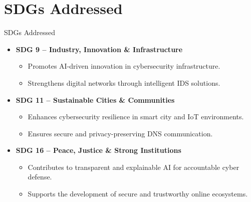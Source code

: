 \documentclass[aspectratio=169,xcolor=dvipsnames]{beamer}
\begin{document}
\section{SDGs Addressed}
\begin{frame}{SDGs Addressed}
\begin{itemize}

\item \textbf{SDG 9 – Industry, Innovation \& Infrastructure}
\begin{itemize}
    \item Promotes AI-driven innovation in cybersecurity infrastructure.
    \item Strengthens digital networks through intelligent IDS solutions.
\end{itemize}

\item \textbf{SDG 11 – Sustainable Cities \& Communities}
\begin{itemize}
    \item Enhances cybersecurity resilience in smart city and IoT environments.
    \item Ensures secure and privacy-preserving DNS communication.
\end{itemize}

\item \textbf{SDG 16 – Peace, Justice \& Strong Institutions}
\begin{itemize}
    \item Contributes to transparent and explainable AI for accountable cyber defense.
    \item Supports the development of secure and trustworthy online ecosystems.
\end{itemize}

\end{itemize}
\end{frame}
\end{document}

